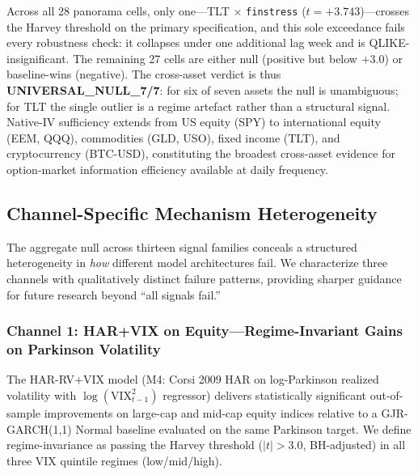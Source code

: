 \documentclass[12pt,a4paper]{article}
\begin{document}
Across all 28 panorama cells, only one---TLT $\times$ \texttt{finstress} ($t = +3.743$)---crosses the Harvey threshold on the primary specification, and this sole exceedance fails every robustness check: it collapses under one additional lag week and is QLIKE-insignificant. The remaining 27 cells are either null (positive but below $+3.0$) or baseline-wins (negative). The cross-asset verdict is thus \textbf{UNIVERSAL\_NULL\_7/7}: for six of seven assets the null is unambiguous; for TLT the single outlier is a regime artefact rather than a structural signal. Native-IV sufficiency extends from US equity (SPY) to international equity (EEM, QQQ), commodities (GLD, USO), fixed income (TLT), and cryptocurrency (BTC-USD), constituting the broadest cross-asset evidence for option-market information efficiency available at daily frequency.

\subsection{Channel-Specific Mechanism Heterogeneity}
\label{subsec:channel_specific}


The aggregate null across thirteen signal families conceals a structured heterogeneity in \emph{how} different model architectures fail. We characterize three channels with qualitatively distinct failure patterns, providing sharper guidance for future research beyond ``all signals fail.''

\subsubsection{Channel 1: HAR+VIX on Equity---Regime-Invariant Gains on Parkinson Volatility}

The HAR-RV+VIX model (M4: Corsi 2009 HAR on log-Parkinson realized volatility with $\log(\text{VIX}^2_{t-1})$ regressor) delivers statistically significant out-of-sample improvements on large-cap and mid-cap equity indices relative to a GJR-GARCH(1,1) Normal baseline evaluated on the same Parkinson target. We define regime-invariance as passing the Harvey threshold ($|t|>3.0$, BH-adjusted) in all three VIX quintile regimes (low/mid/high).
\end{document}

